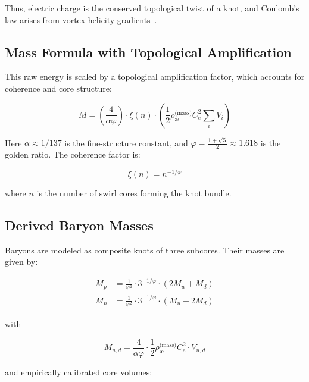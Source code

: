 \documentclass[12pt]{article}
\begin{document}
    Thus, electric charge is the conserved topological twist of a knot, and Coulomb’s law arises from vortex helicity gradients~\cite{ranada1992knots}.

    \subsection{Mass Formula with Topological Amplification}

    This raw energy is scaled by a topological amplification factor, which accounts for coherence and core structure:

    \begin{equation}
    M = \left( \frac{4}{\alpha \varphi} \right) \cdot \xi(n) \cdot \left( \frac{1}{2} \rho_{\text{\ae}}^{\text{(mass)}} C_e^2 \sum_i V_i \right)
    \label{eq:mass_formula_basic}
    \end{equation}

    Here \( \alpha \approx 1/137 \) is the fine-structure constant, and \( \varphi = \frac{1 + \sqrt{5}}{2} \approx 1.618 \) is the golden ratio. The coherence factor is:

    \begin{equation}
    \xi(n) = n^{-1/\varphi}
    \label{eq:coherence_factor}
    \end{equation}

    where \( n \) is the number of swirl cores forming the knot bundle.

    \subsection{Derived Baryon Masses}

    Baryons are modeled as composite knots of three subcores. Their masses are given by:

    \begin{align}
    M_p &= \frac{1}{\varphi^2} \cdot 3^{-1/\varphi} \cdot (2 M_u + M_d) \\
    M_n &= \frac{1}{\varphi^2} \cdot 3^{-1/\varphi} \cdot (M_u + 2 M_d)
    \end{align}

    with

    \begin{equation}
    M_{u,d} = \frac{4}{\alpha \varphi} \cdot \frac{1}{2} \rho_{\text{\ae}}^{\text{(mass)}} C_e^2 \cdot V_{u,d}
    \end{equation}

    and empirically calibrated core volumes:
\end{document}
